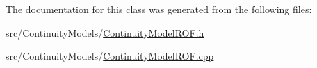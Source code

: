 The documentation for this class was generated from the following files\+:\begin{DoxyCompactItemize}
\item 
src/\+Continuity\+Models/\mbox{\hyperlink{ContinuityModelROF_8h}{Continuity\+Model\+R\+O\+F.\+h}}\item 
src/\+Continuity\+Models/\mbox{\hyperlink{ContinuityModelROF_8cpp}{Continuity\+Model\+R\+O\+F.\+cpp}}\end{DoxyCompactItemize}
